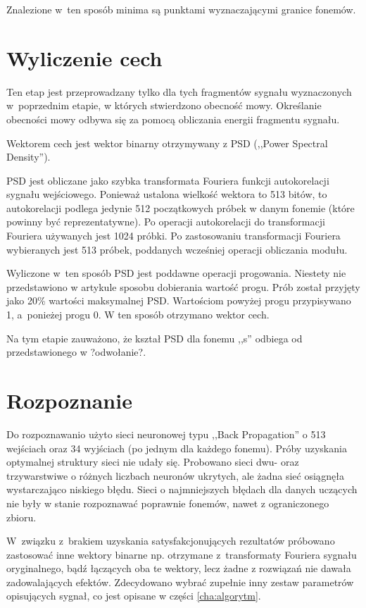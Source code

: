 Znalezione w~ten sposób minima są punktami wyznaczającymi granice fonemów.

\section{Wyliczenie cech}
\label{sec:cechybin}

Ten etap jest przeprowadzany tylko dla tych fragmentów sygnału wyznaczonych w~poprzednim etapie, w których stwierdzono obecność mowy. Określanie obecności mowy odbywa się za pomocą obliczania energii fragmentu sygnału.

Wektorem cech jest wektor binarny otrzymywany z PSD (,,Power Spectral Density'').

PSD jest obliczane jako szybka transformata Fouriera funkcji autokorelacji sygnału wejściowego. Ponieważ ustalona wielkość wektora to 513 bitów, to autokorelacji podlega jedynie 512 początkowych próbek w danym fonemie (które powinny być reprezentatywne). Po operacji autokorelacji do transformacji Fouriera używanych jest 1024 próbki. Po zastosowaniu transformacji Fouriera wybieranych jest 513 próbek, poddanych wcześniej operacji obliczania modułu.

Wyliczone w~ten sposób PSD jest poddawne operacji progowania. Niestety nie przedstawiono w artykule sposobu dobierania wartość progu. Prób został przyjęty jako 20\% wartości maksymalnej PSD. Wartościom powyżej progu przypisywano 1, a~ponieżej progu 0. W ten sposób otrzymano wektor cech.

Na tym etapie zauważono, że kształ PSD dla fonemu ,,s'' odbiega od przedstawionego w ?odwołanie?.

\section{Rozpoznanie}
\label{sec:rozpoznaniebin}

Do rozpoznawanio użyto sieci neuronowej typu ,,Back Propagation'' o 513 wejściach oraz 34 wyjściach (po jednym dla każdego fonemu). Próby uzyskania optymalnej struktury sieci nie udały się. Probowano sieci dwu- oraz trzywarstwiwe o różnych liczbach neuronów ukrytych, ale żadna sieć osiągnęła wystarczająco niskiego błędu. Sieci o najmniejszych błędach dla danych uczących nie były w stanie rozpoznawać poprawnie fonemów, nawet z ograniczonego zbioru.

W~związku z~brakiem uzyskania satysfakcjonujących rezultatów próbowano zastosować inne wektory binarne np. otrzymane z~transformaty Fouriera sygnału oryginalnego, bądź łączących oba te wektory, lecz żadne z rozwiązań nie dawała zadowalających efektów. Zdecydowano wybrać zupełnie inny zestaw parametrów opisujących sygnał, co jest opisane w części \ref{cha:algorytm}.

